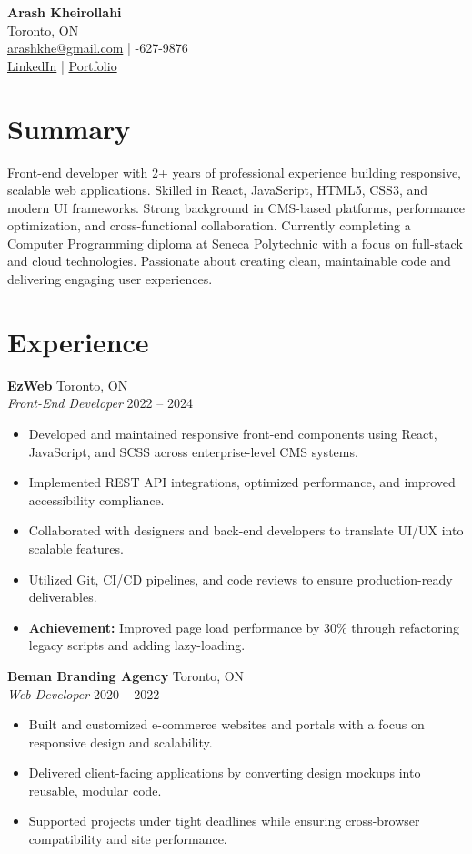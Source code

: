 \documentclass[a4paper,10pt]{article}
\begin{document}
\begin{center}
    {\LARGE \textbf{Arash Kheirollahi}} \\
    Toronto, ON \\
    \href{mailto:arashkhe@gmail.com}{arashkhe@gmail.com} \quad | -627-9876 \\
    \href{https://linkedin.com}{LinkedIn} \quad | \quad \href{https://portfolio.com}{Portfolio}
\end{center}

\section*{Summary}
Front-end developer with 2+ years of professional experience building responsive, scalable web applications. Skilled in React, JavaScript, HTML5, CSS3, and modern UI frameworks. Strong background in CMS-based platforms, performance optimization, and cross-functional collaboration. Currently completing a Computer Programming diploma at Seneca Polytechnic with a focus on full-stack and cloud technologies. Passionate about creating clean, maintainable code and delivering engaging user experiences.

\section*{Experience}

\textbf{EzWeb} \hfill Toronto, ON \\
\textit{Front-End Developer} \hfill 2022 -- 2024
\begin{itemize}[noitemsep,topsep=0pt]
    \item Developed and maintained responsive front-end components using React, JavaScript, and SCSS across enterprise-level CMS systems.
    \item Implemented REST API integrations, optimized performance, and improved accessibility compliance.
    \item Collaborated with designers and back-end developers to translate UI/UX into scalable features.
    \item Utilized Git, CI/CD pipelines, and code reviews to ensure production-ready deliverables.
    \item \textbf{Achievement:} Improved page load performance by 30\% through refactoring legacy scripts and adding lazy-loading.
\end{itemize}

\textbf{Beman Branding Agency} \hfill Toronto, ON \\
\textit{Web Developer} \hfill 2020 -- 2022
\begin{itemize}[noitemsep,topsep=0pt]
    \item Built and customized e-commerce websites and portals with a focus on responsive design and scalability.
    \item Delivered client-facing applications by converting design mockups into reusable, modular code.
    \item Supported projects under tight deadlines while ensuring cross-browser compatibility and site performance.
\end{itemize}
\end{document}
